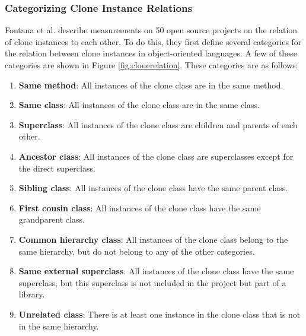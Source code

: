 \documentclass[a4paper]{article}
\begin{document}
\subsubsection{Categorizing Clone Instance Relations}\label{chap:catcloneinstancerelations}
Fontana et al. \cite{fontana2015duplicated} describe measurements on 50 open source projects on the relation of clone instances to each other. To do this, they first define several categories for the relation between clone instances in object-oriented languages. A few of these categories are shown in Figure \ref{fig:clonerelation}. These categories are as follows:
\begin{enumerate}
  \item \textbf{Same method}: All instances of the clone class are in the same method.
  \item \textbf{Same class}: All instances of the clone class are in the same class.
  \item \textbf{Superclass}: All instances of the clone class are children and parents of each other.
  \item \textbf{Ancestor class}: All instances of the clone class are superclasses except for the direct superclass.
  \item \textbf{Sibling class}: All instances of the clone class have the same parent class.
  \item \textbf{First cousin class}: All instances of the clone class have the same grandparent class.
\item \textbf{Common hierarchy class}: All instances of the clone class belong to the same hierarchy, but do not belong to any of the other categories.
\item \textbf{Same external superclass}: All instances of the clone class have the same superclass, but this superclass is not included in the project but part of a library.
\item \textbf{Unrelated class}: There is at least one instance in the clone class that is not in the same hierarchy.
\end{enumerate}
\end{document}
